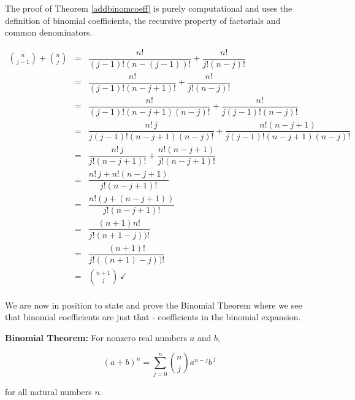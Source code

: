 \documentclass{ximera}
\begin{document}

\smallskip

The proof of Theorem \ref{addbinomcoeff} is purely computational and uses the definition of binomial coefficients, the recursive property of factorials and common denominators.

\[ \begin{array}{rcl}

\displaystyle{\binom{n}{j-1} + \binom{n}{j}} & = & \dfrac{n!}{(j-1)! (n-(j-1))!} + \dfrac{n!}{j! (n-j)!}  \\ [15pt]

& = & \dfrac{n!}{(j-1)! (n-j+1)!} + \dfrac{n!}{j! (n-j)!}  \\ [15pt]

& = & \dfrac{n!}{(j-1)! (n-j+1)(n-j)!} + \dfrac{n!}{j(j-1)! (n-j)!}  \\ [15pt]

& = & \dfrac{n! \, j}{j(j-1)! (n-j+1)(n-j)!} + \dfrac{n! (n-j+1)}{j(j-1)! (n-j+1)(n-j)!} \\ [15pt]

& = & \dfrac{n! \, j}{j! (n-j+1)!} + \dfrac{n! (n-j+1)}{j! (n-j+1)!} \\ [15pt]

& = & \dfrac{n! \, j + n! (n-j+1)}{j! (n-j+1)!} \\ [15pt]

& = & \dfrac{n!\left( j + (n-j+1)\right)}{j! (n-j+1)!} \\ [15pt]

& = & \dfrac{(n+1) n!}{j! (n+1-j))!} \\ [15pt] 

& = & \dfrac{(n+1)!} {j! ((n+1)-j))!} \\ [15pt]

& = & \displaystyle{\binom{n+1}{j}} \, \checkmark \\ 

\end{array} \]

We are now in position to state and prove the Binomial Theorem where we see that binomial coefficients are just that - coefficients in the binomial expansion.

\smallskip


\begin{theorem}  \label{BinomialTheorem}  \textbf{Binomial Theorem:}  For nonzero real numbers $a$ and $b$,

\[(a+b)^{n} =\displaystyle{\sum_{j=0}^{n} \binom{n}{j} a^{n-j} b^{\, j}} \]

for all natural numbers $n$.

\end{theorem}
\end{document}
